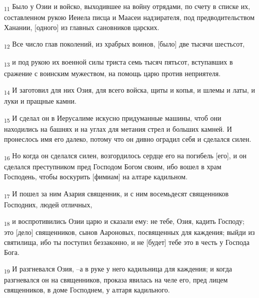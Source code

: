 \begin{tcolorbox}
\textsubscript{11} Было у Озии и войско, выходившее на войну отрядами, по счету в списке их, составленном рукою Иеиела писца и Маасеи надзирателя, под предводительством Ханании, [одного] из главных сановников царских.
\end{tcolorbox}
\begin{tcolorbox}
\textsubscript{12} Все число глав поколений, из храбрых воинов, [было] две тысячи шестьсот,
\end{tcolorbox}
\begin{tcolorbox}
\textsubscript{13} и под рукою их военной силы триста семь тысяч пятьсот, вступавших в сражение с воинским мужеством, на помощь царю против неприятеля.
\end{tcolorbox}
\begin{tcolorbox}
\textsubscript{14} И заготовил для них Озия, для всего войска, щиты и копья, и шлемы и латы, и луки и пращные камни.
\end{tcolorbox}
\begin{tcolorbox}
\textsubscript{15} И сделал он в Иерусалиме искусно придуманные машины, чтоб они находились на башнях и на углах для метания стрел и больших камней. И пронеслось имя его далеко, потому что он дивно оградил себя и сделался силен.
\end{tcolorbox}
\begin{tcolorbox}
\textsubscript{16} Но когда он сделался силен, возгордилось сердце его на погибель [его], и он сделался преступником пред Господом Богом своим, ибо вошел в храм Господень, чтобы воскурить [фимиам] на алтаре кадильном.
\end{tcolorbox}
\begin{tcolorbox}
\textsubscript{17} И пошел за ним Азария священник, и с ним восемьдесят священников Господних, людей отличных,
\end{tcolorbox}
\begin{tcolorbox}
\textsubscript{18} и воспротивились Озии царю и сказали ему: не тебе, Озия, кадить Господу; это [дело] священников, сынов Аароновых, посвященных для каждения; выйди из святилища, ибо ты поступил беззаконно, и не [будет] тебе это в честь у Господа Бога.
\end{tcolorbox}
\begin{tcolorbox}
\textsubscript{19} И разгневался Озия, --а в руке у него кадильница для каждения; и когда разгневался он на священников, проказа явилась на челе его, пред лицем священников, в доме Господнем, у алтаря кадильного.
\end{tcolorbox}
